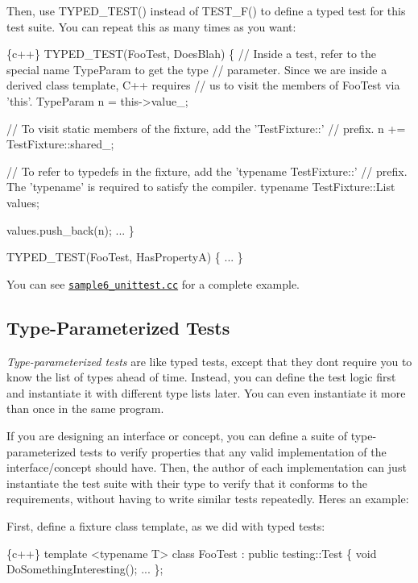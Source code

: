Then, use {\ttfamily T\+Y\+P\+E\+D\+\_\+\+T\+E\+S\+T()} instead of {\ttfamily T\+E\+S\+T\+\_\+\+F()} to define a typed test for this test suite. You can repeat this as many times as you want\+:


\begin{DoxyCode}
\{c++\}
TYPED\_TEST(FooTest, DoesBlah) \{
  // Inside a test, refer to the special name TypeParam to get the type
  // parameter.  Since we are inside a derived class template, C++ requires
  // us to visit the members of FooTest via 'this'.
  TypeParam n = this->value\_;

  // To visit static members of the fixture, add the 'TestFixture::'
  // prefix.
  n += TestFixture::shared\_;

  // To refer to typedefs in the fixture, add the 'typename TestFixture::'
  // prefix.  The 'typename' is required to satisfy the compiler.
  typename TestFixture::List values;

  values.push\_back(n);
  ...
\}

TYPED\_TEST(FooTest, HasPropertyA) \{ ... \}
\end{DoxyCode}


You can see \href{https://github.com/google/googletest/blob/main/googletest/samples/sample6_unittest.cc}{\tt sample6\+\_\+unittest.\+cc} for a complete example.

\subsection*{Type-\/\+Parameterized Tests}

{\itshape Type-\/parameterized tests} are like typed tests, except that they don\textquotesingle{}t require you to know the list of types ahead of time. Instead, you can define the test logic first and instantiate it with different type lists later. You can even instantiate it more than once in the same program.

If you are designing an interface or concept, you can define a suite of type-\/parameterized tests to verify properties that any valid implementation of the interface/concept should have. Then, the author of each implementation can just instantiate the test suite with their type to verify that it conforms to the requirements, without having to write similar tests repeatedly. Here\textquotesingle{}s an example\+:

First, define a fixture class template, as we did with typed tests\+:


\begin{DoxyCode}
\{c++\}
template <typename T>
class FooTest : public testing::Test \{
  void DoSomethingInteresting();
  ...
\};
\end{DoxyCode}


